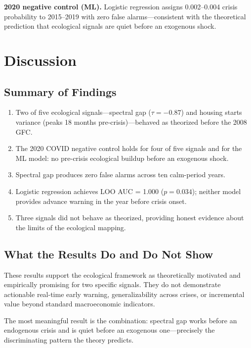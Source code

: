\documentclass[12pt,a4paper]{article}
\begin{document}
\textbf{2020 negative control (ML).} Logistic regression assigns 0.002--0.004 crisis
probability to 2015--2019 with zero false alarms---consistent with the theoretical
prediction that ecological signals are quiet before an exogenous shock.

\section{Discussion}

\subsection{Summary of Findings}

\begin{enumerate}
\item Two of five ecological signals---spectral gap ($\tau = -0.87$) and housing starts
variance (peaks 18 months pre-crisis)---behaved as theorized before the 2008 GFC.

\item The 2020 COVID negative control holds for four of five signals and for the ML
model: no pre-crisis ecological buildup before an exogenous shock.

\item Spectral gap produces zero false alarms across ten calm-period years.

\item Logistic regression achieves LOO AUC = 1.000 ($p = 0.034$); neither model
provides advance warning in the year before crisis onset.

\item Three signals did not behave as theorized, providing honest evidence about
the limits of the ecological mapping.
\end{enumerate}

\subsection{What the Results Do and Do Not Show}

These results support the ecological framework as theoretically motivated and
empirically promising for two specific signals. They do not demonstrate actionable
real-time early warning, generalizability across crises, or incremental value beyond
standard macroeconomic indicators.

The most meaningful result is the combination: spectral gap works before an endogenous
crisis and is quiet before an exogenous one---precisely the discriminating pattern
the theory predicts.
\end{document}
